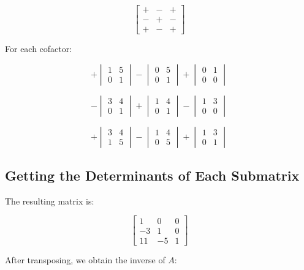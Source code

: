 \documentclass{article}
\begin{document}
\[
\begin{bmatrix}
+ & - & + \\
- & + & - \\
+ & - & +
\end{bmatrix}
\]

For each cofactor:

\[
+ \begin{vmatrix} 1 & 5 \\ 0 & 1 \end{vmatrix}
- \begin{vmatrix} 0 & 5 \\ 0 & 1 \end{vmatrix}
+ \begin{vmatrix} 0 & 1 \\ 0 & 0 \end{vmatrix}
\]

\[
- \begin{vmatrix} 3 & 4 \\ 0 & 1 \end{vmatrix}
+ \begin{vmatrix} 1 & 4 \\ 0 & 1 \end{vmatrix}
- \begin{vmatrix} 1 & 3 \\ 0 & 0 \end{vmatrix}
\]

\[
+ \begin{vmatrix} 3 & 4 \\ 1 & 5 \end{vmatrix}
- \begin{vmatrix} 1 & 4 \\ 0 & 5 \end{vmatrix}
+ \begin{vmatrix} 1 & 3 \\ 0 & 1 \end{vmatrix}
\]

\subsection*{Getting the Determinants of Each Submatrix}

The resulting matrix is:

\[
\begin{bmatrix}
1 & 0 & 0 \\
-3 & 1 & 0 \\
11 & -5 & 1
\end{bmatrix}
\]

After transposing, we obtain the inverse of \( A \):
\end{document}

